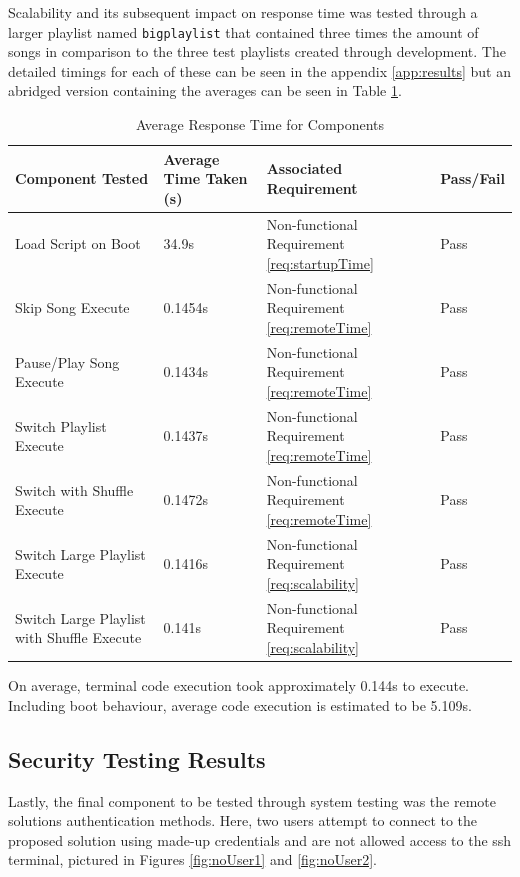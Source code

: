 Scalability and its subsequent impact on response time was tested through a larger playlist named \texttt{bigplaylist} that contained three times the amount of songs in comparison to the three test playlists created through development. The detailed timings for each of these can be seen in the appendix \ref{app:results} but an abridged version containing the averages can be seen in Table \ref{tab:avgResTime}.
\begin{table}[H]
  \centering
  \caption{Average Response Time for Components}
  \label{tab:avgResTime}
  \begin{tabularx}{\linewidth}{XlXl}
    \toprule
    Component Tested & Average Time Taken (s) & Associated Requirement & Pass/Fail \\
    \midrule
    Load Script on Boot & 34.9s & Non-functional Requirement \ref{req:startupTime} & Pass \\ \hline
    Skip Song Execute & 0.1454s & Non-functional Requirement \ref{req:remoteTime} & Pass \\ \hline
    Pause/Play Song Execute & 0.1434s & Non-functional Requirement \ref{req:remoteTime} & Pass \\ \hline
    Switch Playlist Execute & 0.1437s & Non-functional Requirement \ref{req:remoteTime} & Pass \\ \hline
    Switch with Shuffle Execute & 0.1472s & Non-functional Requirement \ref{req:remoteTime} & Pass \\ \hline
    Switch Large Playlist Execute & 0.1416s & Non-functional Requirement \ref{req:scalability} & Pass \\ \hline
    Switch Large Playlist with Shuffle Execute & 0.141s & Non-functional Requirement \ref{req:scalability} & Pass \\ \hline
    \bottomrule
  \end{tabularx}
\end{table}

On average, terminal code execution took approximately 0.144s to execute. Including boot behaviour, average code execution is estimated to be 5.109s.

\subsection{Security Testing Results}\label{subsec:secureResults}
Lastly, the final component to be tested through system testing was the remote solutions authentication methods. Here, two users attempt to connect to the proposed solution using made-up credentials and are not allowed access to the \gls{ssh} terminal, pictured in Figures \ref{fig:noUser1} and \ref{fig:noUser2}.

